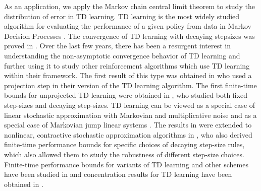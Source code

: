 \documentclass[11pt]{article}
\begin{document}
As an application, we apply the Markov chain central limit theorem to study the distribution of error in TD learning. TD learning is the most widely studied algorithm for evaluating the performance of a given policy from data in Markov Decision Processes \citep{sutton2018reinforcement}. The convergence of TD learning with decaying stepsizes was proved in \citep{tsitsiklis1996analysis}. Over the last few years, there has been a resurgent interest in understanding the non-asymptotic convergence behavior of TD learning and further using it to study other reinforcement algorithms which use TD learning within their framework. The first result of this type was obtained in \citep{bhandari2018finite} who used a projection step in their version of the TD learning algorithm. The first finite-time bounds for unprojected TD learning were obtained in \citep{srikant2019finite}, who studied both fixed step-sizes and decaying step-sizes. TD learning can be viewed as a special case of linear stochastic approximation with Markovian and multiplicative noise and as a special case of Markovian jump linear systems \citep{hu2019characterizing}. The results in \citep{srikant2019finite} were extended to nonlinear, contractive stochastic approximation algorithms in \citep{chen2023lyapunov}, who also derived finite-time performance bounds for specific choices of decaying step-size rules, which also allowed them to study the robustness of different step-size choices. Finite-time performance bounds for variants of TD learning and other schemes have been studied in \citep{gupta2019finite,doan2021finite,doan2022nonlinear} and concentration results for TD learning have been obtained in \citep{telgarsky2022stochastic,chen2023concentration}.
\end{document}
